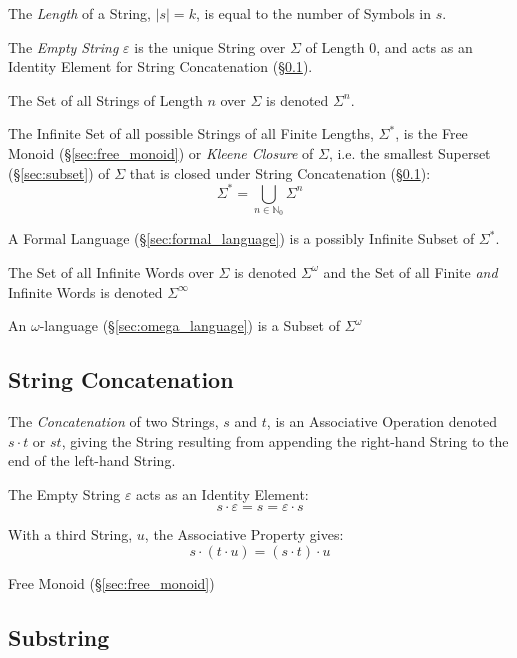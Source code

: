 The \emph{Length} of a String, $|s| = k$, is equal to the number of
Symbols in $s$.

The \emph{Empty String} $\varepsilon$ is the unique String over
$\Sigma$ of Length 0, and acts as an Identity Element for String
Concatenation (\S\ref{sec:string_concatenation}).

The Set of all Strings of Length $n$ over $\Sigma$ is denoted
$\Sigma^n$.

The Infinite Set of all possible Strings of all Finite Lengths,
$\Sigma^*$, is the Free Monoid (\S\ref{sec:free_monoid}) or
\emph{Kleene Closure} of $\Sigma$, i.e. the smallest Superset
(\S\ref{sec:subset}) of $\Sigma$ that is closed under String
Concatenation (\S\ref{sec:string_concatenation}):
\[
  \Sigma^* = \bigcup_{n\in\mathbb{N}_0} \Sigma^n
\]

A Formal Language (\S\ref{sec:formal_language}) is a possibly Infinite
Subset of $\Sigma^*$.

The Set of all Infinite Words over $\Sigma$ is denoted $\Sigma^\omega$
and the Set of all Finite \emph{and} Infinite Words is denoted
$\Sigma^\infty$

An $\omega$-language (\S\ref{sec:omega_language}) is a Subset of
$\Sigma^\omega$



\subsection{String Concatenation}\label{sec:string_concatenation}

The \emph{Concatenation} of two Strings, $s$ and $t$, is an
Associative Operation denoted $s \cdot t$ or $st$, giving the String
resulting from appending the right-hand String to the end of the
left-hand String.

The Empty String $\varepsilon$ acts as an Identity Element:
\[
  s \cdot \varepsilon = s = \varepsilon \cdot s
\]

With a third String, $u$, the Associative Property gives:
\[
  s \cdot (t \cdot u) = (s \cdot t) \cdot u
\]

Free Monoid (\S\ref{sec:free_monoid})



\subsection{Substring}\label{sec:substring}

